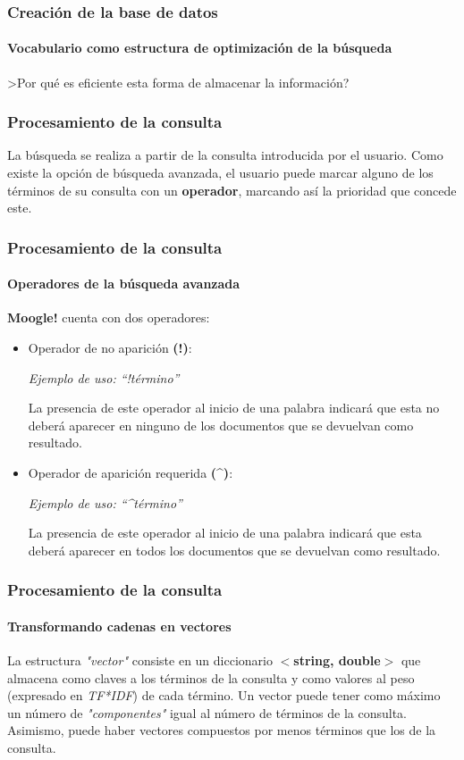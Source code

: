 \documentclass{beamer}
\begin{document}
\begin{frame}
    \frametitle{Creaci\'on de la base de datos}
    \framesubtitle{Vocabulario como estructura de optimizaci\'on de la b\'usqueda}
    \centering
    >Por qu\'e es eficiente esta forma de almacenar la informaci\'on?
\end{frame}
\begin{frame}
    \frametitle{Procesamiento de la consulta}
    La b\'usqueda se realiza a partir de la consulta introducida por el usuario. Como existe la opci\'on de b\'usqueda avanzada, el usuario puede marcar alguno de los t\'erminos de su consulta con un \textbf{operador}, marcando as\'i la prioridad que concede este.
    
\end{frame}
\begin{frame}
    \frametitle{Procesamiento de la consulta}
    \framesubtitle{Operadores de la b\'usqueda avanzada}
    \textbf{Moogle!} cuenta con dos operadores:
    \vspace*{3mm}
    \begin{itemize}
        \item Operador de no aparición \textbf{(!)}:
        
        \vspace*{0.8mm}
        \small\textit{Ejemplo de uso: “!término”}

        \small La presencia de este operador al inicio de una palabra indicará que esta no deberá 	aparecer en ninguno de los documentos que se devuelvan como resultado.
        \vspace{3mm}
        \item Operador de aparición requerida \textbf{(\textasciicircum)}:
        
        \vspace*{0.8mm}
        \small\textit{Ejemplo de uso: “\textasciicircum término”}

        La presencia de este operador al inicio de una palabra indicará que esta deberá aparecer en todos los documentos que se devuelvan como resultado.
    \end{itemize}
\end{frame}
\begin{frame}
    \frametitle{Procesamiento de la consulta}
    \framesubtitle{Transformando cadenas en vectores}
    La estructura \textit{"vector"} consiste en un diccionario \textbf{$<$string, double$>$} que almacena como claves a los t\'erminos de la consulta y como valores al peso (expresado en \textit{TF*IDF}) de cada t\'ermino.
    \vspace{5mm}
    Un vector puede tener como m\'aximo un n\'umero de \textit{"componentes"} igual al n\'umero de t\'erminos de la consulta. Asimismo, puede haber vectores compuestos por menos t\'erminos que los de la consulta.
\end{frame}
\end{document}
